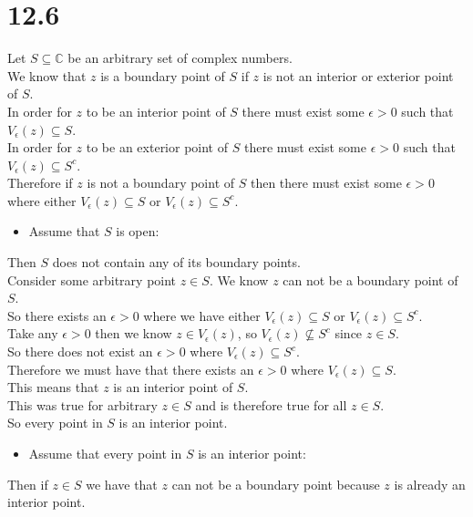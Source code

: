 \documentclass{article}
\begin{document}
\section*{12.6}
\begin{center}
    \doublespacing
    Let $S\subseteq\mathbb{C}$ be an arbitrary set of complex numbers.
    \\We know that $z$ is a boundary point of $S$ if $z$ is not an interior or exterior point of $S$.
    \\In order for $z$ to be an interior point of $S$ there must exist some $\epsilon > 0$ such that $V_{\epsilon} (z)\subseteq S$.
    \\In order for $z$ to be an exterior point of $S$ there must exist some $\epsilon > 0$ such that $V_{\epsilon} (z)\subseteq S^c$.
    \\Therefore if $z$ is not a boundary point of $S$ then there must exist some $\epsilon > 0$ where either $V_{\epsilon} (z)\subseteq S$ or $V_{\epsilon} (z)\subseteq S^c$.
    \begin{itemize}
        \item Assume that $S$ is open:
    \end{itemize}
    Then $S$ does not contain any of its boundary points.
    \\Consider some arbitrary point $z\in S$. We know $z$ can not be a boundary point of $S$.
    \\So there exists an $\epsilon > 0$ where we have either $V_{\epsilon} (z)\subseteq S$ or $V_{\epsilon} (z)\subseteq S^c$.
    \\Take any $\epsilon > 0$ then we know $z\in V_{\epsilon} (z)$, so $V_{\epsilon} (z)\not\subseteq S^c$ since $z\in S$.
    \\So there does not exist an $\epsilon > 0$ where $V_{\epsilon} (z)\subseteq S^c$.
    \\Therefore we must have that there exists an $\epsilon > 0$ where $V_{\epsilon} (z)\subseteq S$.
    \\This means that $z$ is an interior point of $S$.
    \\This was true for arbitrary $z\in S$ and is therefore true for all $z\in S$.
    \\So every point in $S$ is an interior point.
    \begin{itemize}
        \item Assume that every point in $S$ is an interior point:
    \end{itemize}
    Then if $z\in S$ we have that $z$ can not be a boundary point because $z$ is already an interior point.

\end{center}
\end{document}
